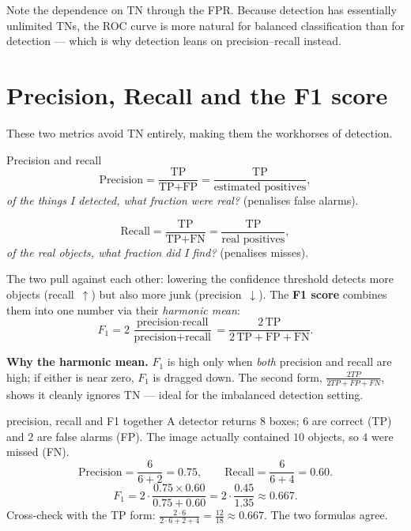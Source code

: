 \documentclass{report}
\begin{document}
Note the dependence on TN through the FPR. Because detection has essentially
unlimited TNs, the ROC curve is more natural for balanced classification than
for detection --- which is why detection leans on precision--recall instead.

\section{Precision, Recall and the F1 score}

These two metrics avoid TN entirely, making them the workhorses of detection.

\begin{defbox}{Precision and recall}
\[
\text{Precision} = \frac{\text{TP}}{\text{TP}+\text{FP}}
= \frac{\text{TP}}{\text{estimated positives}},
\]
\emph{of the things I detected, what fraction were real?} (penalises false
alarms).

\medskip
\[
\text{Recall} = \frac{\text{TP}}{\text{TP}+\text{FN}}
= \frac{\text{TP}}{\text{real positives}},
\]
\emph{of the real objects, what fraction did I find?} (penalises misses).
\end{defbox}

The two pull against each other: lowering the confidence threshold detects more
objects (recall~$\uparrow$) but also more junk (precision~$\downarrow$). The
\textbf{F1 score} combines them into one number via their \emph{harmonic mean}:
\[
F_1 = 2\,\frac{\text{precision}\cdot\text{recall}}{\text{precision}+\text{recall}}
= \frac{2\,\text{TP}}{2\,\text{TP}+\text{FP}+\text{FN}} .
\]

\begin{keybox}
\textbf{Why the harmonic mean.} $F_1$ is high only when \emph{both} precision
and recall are high; if either is near zero, $F_1$ is dragged down. The
second form, $\tfrac{2TP}{2TP+FP+FN}$, shows it cleanly ignores TN --- ideal for
the imbalanced detection setting.
\end{keybox}

\begin{exbox}{precision, recall and F1 together}
A detector returns $8$ boxes; $6$ are correct (TP) and $2$ are false alarms
(FP). The image actually contained $10$ objects, so $4$ were missed (FN).
\[
\text{Precision} = \frac{6}{6+2} = 0.75,
\qquad
\text{Recall} = \frac{6}{6+4} = 0.60 .
\]
\[
F_1 = 2\cdot\frac{0.75\times 0.60}{0.75+0.60}
= 2\cdot\frac{0.45}{1.35} \approx 0.667 .
\]
Cross-check with the TP form: $\tfrac{2\cdot 6}{2\cdot 6 + 2 + 4}
= \tfrac{12}{18} \approx 0.667$. The two formulas agree.
\end{exbox}
\end{document}
